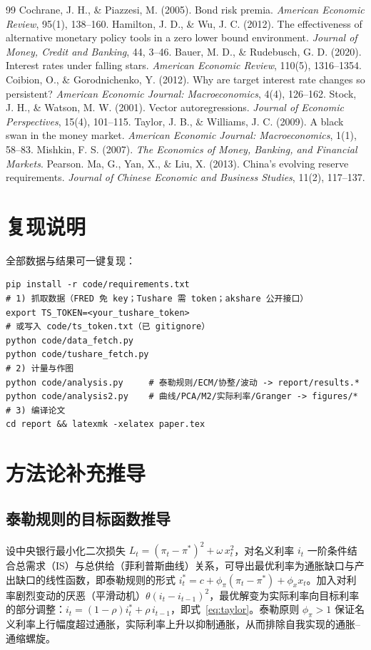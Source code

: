 \documentclass[12pt,a4paper]{ctexart}
\begin{document}
\begin{thebibliography}{99}
 Cochrane, J. H., \& Piazzesi, M. (2005). Bond risk premia. \emph{American Economic Review}, 95(1), 138--160.
 Hamilton, J. D., \& Wu, J. C. (2012). The effectiveness of alternative monetary policy tools in a zero lower bound environment. \emph{Journal of Money, Credit and Banking}, 44, 3--46.
 Bauer, M. D., \& Rudebusch, G. D. (2020). Interest rates under falling stars. \emph{American Economic Review}, 110(5), 1316--1354.
 Coibion, O., \& Gorodnichenko, Y. (2012). Why are target interest rate changes so persistent? \emph{American Economic Journal: Macroeconomics}, 4(4), 126--162.
 Stock, J. H., \& Watson, M. W. (2001). Vector autoregressions. \emph{Journal of Economic Perspectives}, 15(4), 101--115.
 Taylor, J. B., \& Williams, J. C. (2009). A black swan in the money market. \emph{American Economic Journal: Macroeconomics}, 1(1), 58--83.
 Mishkin, F. S. (2007). \emph{The Economics of Money, Banking, and Financial Markets}. Pearson.
 Ma, G., Yan, X., \& Liu, X. (2013). China's evolving reserve requirements. \emph{Journal of Chinese Economic and Business Studies}, 11(2), 117--137.
\end{thebibliography}

\clearpage
\appendix
\section{复现说明}
全部数据与结果可一键复现：
\begingroup
\footnotesize
\begin{verbatim}
pip install -r code/requirements.txt
# 1) 抓取数据（FRED 免 key；Tushare 需 token；akshare 公开接口）
export TS_TOKEN=<your_tushare_token>
# 或写入 code/ts_token.txt（已 gitignore）
python code/data_fetch.py
python code/tushare_fetch.py
# 2) 计量与作图
python code/analysis.py     # 泰勒规则/ECM/协整/波动 -> report/results.*
python code/analysis2.py    # 曲线/PCA/M2/实际利率/Granger -> figures/*
# 3) 编译论文
cd report && latexmk -xelatex paper.tex
\end{verbatim}
\endgroup

\section{方法论补充推导}

\subsection{泰勒规则的目标函数推导}
设中央银行最小化二次损失 $L_t = (\pi_t-\pi^{*})^2 + \omega\, x_t^2$，对名义利率 $i_t$ 一阶条件结合总需求（IS）与总供给（菲利普斯曲线）关系，可导出最优利率为通胀缺口与产出缺口的线性函数，即泰勒规则的形式 $i_t^{*} = c + \phi_\pi(\pi_t-\pi^{*}) + \phi_x x_t$。加入对利率剧烈变动的厌恶（平滑动机）$\theta(i_t-i_{t-1})^2$，最优解变为实际利率向目标利率的部分调整：$i_t = (1-\rho) i_t^{*} + \rho\, i_{t-1}$，即式~\eqref{eq:taylor}。泰勒原则 $\phi_\pi>1$ 保证名义利率上行幅度超过通胀，实际利率上升以抑制通胀，从而排除自我实现的通胀--通缩螺旋。
\end{document}
